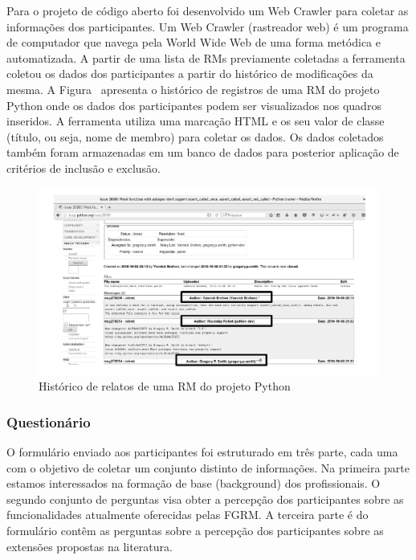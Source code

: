 Para o projeto de código aberto foi desenvolvido um Web Crawler para coletar as
informações dos participantes. Um Web Crawler (rastreador web) é um programa de
computador que navega pela World Wide Web de uma forma metódica e automatizada.
A partir de uma lista de RMs previamente coletadas a ferramenta coletou os dados
dos participantes a partir do histórico de modificações da mesma. A
Figura~\cite{fig:historico-rm-python} apresenta o histórico de registros de uma
RM do projeto Python onde os dados dos participantes podem ser visualizados nos
quadros inseridos. A ferramenta utiliza uma marcação HTML e os seu valor de
classe (título, ou seja, nome de membro) para coletar os dados. Os dados
coletados também foram armazenadas em um banco de dados para posterior aplicação
de critérios de inclusão e exclusão.

\begin{figure}[htpb]
	\centering
	\includegraphics[width=0.6\linewidth]{./chapter-pesquisa-com-profissionais/img/historico-rm-python.pdf}
	\caption{Histórico de relatos de uma RM do projeto Python}
\label{fig:historico-rm-python}
\end{figure}

\subsubsection{Questionário}
\label{subsec:questionario}

O formulário enviado aos participantes foi estruturado em três parte, cada uma
com o objetivo de coletar um conjunto distinto de informações. Na primeira parte
estamos interessados na formação de base (background) dos profissionais. O
segundo conjunto de perguntas visa obter a percepção dos participantes sobre as
funcionalidades atualmente oferecidas pelas FGRM\@. A terceira parte é do
formulário contêm as perguntas sobre a percepção dos participantes sobre as
extensões propostas na literatura.

